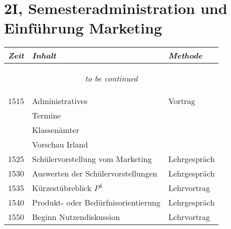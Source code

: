 \documentclass[a4paper]{scrreprt}
\begin{document}
\section*{2I, Semesteradministration und Einführung Marketing}
\begin{longtable}{p{1.5cm}>{\RaggedRight}p{7.5cm}p{2.5cm}}
    \toprule
    \emph{Zeit}&\emph{Inhalt}&\emph{Methode}\\
    \midrule
    \endhead

    \midrule
    \multicolumn{3}{c}{\begin{tiny}\textit{to be continued}\end{tiny}}\\
    \midrule
    \endfoot

    \bottomrule
    \endlastfoot

    1515&Administratives&Vortrag\\
        &Termine&\\
        &Klassenämter&\\
        &Vorschau Irland&\\ [5pt]

    1525&Schülervorstellung vom Marketing&Lehrgespräch\\ [5pt]

    1530&Auswerten der Schülervorstellungen&Lehrgespräch\\ [5pt]

    1535&Kürzestübreblick $P^4$&Lehrvortrag\\ [5pt]

    1540&Produkt- oder Bedürfnisorientierung&Lehrgespräch\\ [5pt]

    1550&Beginn Nutzendiskussion&Lehrvortrag\\

\end{longtable}
\end{document}
